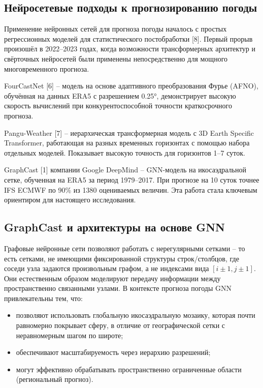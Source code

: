 \documentclass[14pt,a4paper]{extarticle}
\numberwithin{table}{section}
\numberwithin{figure}{section}
\numberwithin{equation}{section}
\begin{document}
\subsection{Нейросетевые подходы к прогнозированию погоды}\label{ux43dux435ux439ux440ux43eux441ux435ux442ux435ux432ux44bux435-ux43fux43eux434ux445ux43eux434ux44b-ux43a-ux43fux440ux43eux433ux43dux43eux437ux438ux440ux43eux432ux430ux43dux438ux44e-ux43fux43eux433ux43eux434ux44b}

Применение нейронных сетей для прогноза погоды началось с простых
регрессионных моделей для статистического постобработки {[}8{]}.
Первый прорыв произошёл в 2022--2023 годах, когда возможности
трансформерных архитектур и свёрточных нейросетей были применены
непосредственно для мощного многовременного прогноза.

FourCastNet {[}6{]} -- модель на основе адаптивного
преобразования Фурье (AFNO), обучённая на данных ERA5 с разрешением
0.25°, демонстрирует высокую скорость вычислений при конкурентоспособной
точности краткосрочного прогноза.

Pangu-Weather {[}7{]} -- иерархическая трансформерная модель с
3D Earth Specific Transformer, работающая на разных временных
горизонтах с помощью набора отдельных моделей. Показывает высокую
точность для горизонтов 1--7 суток.

GraphCast {[}1{]} компании Google DeepMind -- GNN-модель на
икосаэдральной сетке, обученная на ERA5 за период 1979--2017. При прогнозе на 10
суток точнее IFS ECMWF по 90\% из 1380 оцениваемых величин. Эта работа
стала ключевым ориентиром для настоящего исследования.

\subsection{GraphCast и архитектуры на основе GNN}\label{graphcast-ux438-ux430ux440ux445ux438ux442ux435ux43aux442ux443ux440ux44b-ux43dux430-ux43eux441ux43dux43eux432ux435-gnn}

Графовые нейронные сети позволяют работать с нерегулярными
сетками -- то есть сетками, не имеющими фиксированной структуры
строк/столбцов, где соседи узла задаются произвольным графом, а не
индексами вида \([i\pm 1, j\pm 1]\). Они естественным образом
моделируют передачу информации между пространственно связанными
узлами. В контексте прогноза погоды GNN привлекательны тем, что:
\begin{itemize}
\item позволяют использовать глобальную икосаэдральную мозаику,
которая почти равномерно покрывает сферу, в отличие от географической
сетки с неравномерным шагом по широте;
\item обеспечивают масштабируемость через иерархию разрешений;
\item могут эффективно обрабатывать пространственно ограниченные
области (региональный прогноз).
\end{itemize}
\end{document}
